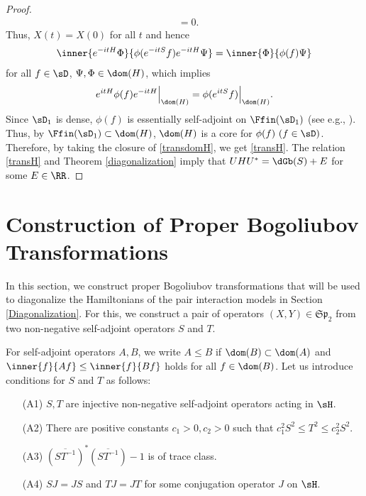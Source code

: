 \documentclass[12pt]{article}
\theoremstyle{plain}
\numberwithin{equation}{section}
\theoremstyle{remark}
\begin{document}
\begin{proof}
\begin{align*}
&= 0.
\end{align*}
Thus, $X(t)=X(0)$ for all $t$ and hence
\begin{align*}
  \inner{e^{-itH}\Phi}{\phi(e^{-itS}f)e^{-itH}\Psi}
  = \inner{\Phi}{\phi(f)\Psi}
\end{align*}
for all $f\in\sD$, $\Psi,\Phi\in\dom(H)$, which implies
\begin{align}
  e^{itH} \phi(f) e^{-itH} \Big|_{\dom(H)} = \phi(e^{itS}f) \Big|_{\dom(H)}. \label{transdomH}
\end{align}
Since $\sD_1$ is dense, $\phi(f)$ is essentially self-adjoint on $\Ffin(\sD_1)$ (see e.g., \cite[Theorem 5.22]{A18}).
Thus, by $\Ffin(\sD_1)\subset \dom(H)$, $\dom(H)$ is a core for $\phi(f)~(f\in\sD)$.
Therefore, by taking the closure of \eqref{transdomH}, we get \eqref{transH}.
The relation \eqref{transH} and Theorem \ref{diagonalization} imply that 
$UHU^*=\dGb(S)+E$ for some $E\in\RR$.
\end{proof}







\section{Construction of Proper Bogoliubov Transformations}\label{construct}
In this section, we construct proper Bogoliubov transformations
that will be used to diagonalize the Hamiltonians of the pair interaction models in Section \ref{Diagonalization}.
For this, we construct a pair of operators $(X,Y) \in \mathfrak{Sp}_2$ from two non-negative self-adjoint operators $S$ and $T$.

For self-adjoint operators $A, B$, we write $A \leq B$ if $\dom(B) \subset \dom(A)$ and $\inner{f}{Af} \leq \inner{f}{Bf}$ holds for all $f \in \dom(B)$.
Let us introduce conditions for $S$ and $T$ as follows:
\begin{enumerate}
\item[(A1)] $S, T$ are injective non-negative self-adjoint operators acting in $\sH$. 
\item[(A2)] There are positive constants $c_1>0, c_2>0$ such that $c_1^2 S^2\leq T^2 \leq c_2^2S^2$. 
\item[(A3)] $\left(\overline{ST^{-1}}\right)^*\left(\overline{ST^{-1}}\right)-1$ is of trace class.
\item[(A4)] $SJ=JS$ and $TJ=JT$ for some conjugation operator $J$ on $\sH$.
\end{enumerate}
\end{document}
